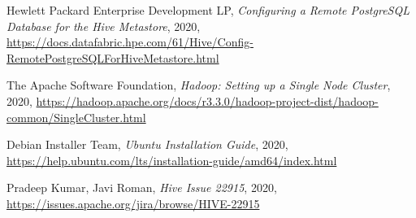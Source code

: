 \documentclass{article}
\begin{document}
\newpage
\begin{thebibliography}{9}
    Hewlett Packard Enterprise Development LP,
    \textit{Configuring a Remote PostgreSQL Database for the Hive Metastore},
    2020,
    \url{https://docs.datafabric.hpe.com/61/Hive/Config-RemotePostgreSQLForHiveMetastore.html}
    
    The Apache Software Foundation,
    \textit{Hadoop: Setting up a Single Node Cluster},
    2020,
    \url{https://hadoop.apache.org/docs/r3.3.0/hadoop-project-dist/hadoop-common/SingleCluster.html}

    Debian Installer Team,
    \textit{Ubuntu Installation Guide},
    2020,
    \url{https://help.ubuntu.com/lts/installation-guide/amd64/index.html}

    Pradeep Kumar, Javi Roman,
    \textit{Hive Issue 22915},
    2020,
    \url{https://issues.apache.org/jira/browse/HIVE-22915}
\end{thebibliography}
\end{document}
